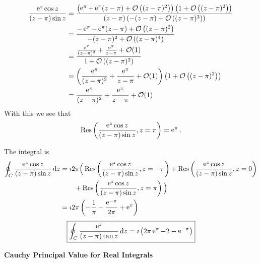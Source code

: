 {\begin{Solution}
\begin{enumerate}
    \begin{align*}
      \frac{\mathop{\mathrm{e}}\nolimits^z \cos z}{ (z - \pi) \sin z } 
      &= \frac{ \left( \mathop{\mathrm{e}}\nolimits^\pi + \mathop{\mathrm{e}}\nolimits^\pi (z - \pi) 
          + \mathcal{O}\left( (z - \pi)^2 \right) \right)
        \left( 1 + \mathcal{O}\left( (z - \pi)^2 \right) \right) }
      { (z - \pi) \left( - (z - \pi) 
          + \mathcal{O}\left( (z - \pi)^3 \right) \right) } \\
      &= \frac{ - \mathop{\mathrm{e}}\nolimits^\pi - \mathop{\mathrm{e}}\nolimits^\pi (z - \pi) 
        + \mathcal{O}\left( (z - \pi)^2 \right) }
      { - (z - \pi)^2 + \mathcal{O}\left( (z - \pi)^4 \right) } \\
      &= \frac{ \frac{ \mathop{\mathrm{e}}\nolimits^\pi }{ (z - \pi)^2 } 
        + \frac{ \mathop{\mathrm{e}}\nolimits^\pi }{ z - \pi } + \mathcal{O}( 1 ) }
      { 1 + \mathcal{O}\left( (z - \pi)^2 \right) } \\
      &= \left( \frac{ \mathop{\mathrm{e}}\nolimits^\pi }{ (z - \pi)^2 } 
        + \frac{ \mathop{\mathrm{e}}\nolimits^\pi }{ z - \pi } + \mathcal{O}( 1 ) \right)
      \left( 1 + \mathcal{O}\left( (z - \pi)^2 \right) \right) \\
      &= \frac{ \mathop{\mathrm{e}}\nolimits^\pi }{ (z - \pi)^2 } 
      + \frac{ \mathop{\mathrm{e}}\nolimits^\pi }{ z - \pi } + \mathcal{O}( 1 )
    \end{align*}
    With this we see that
    \[
    \mathop{\mathrm{Res}}\nolimits \left( \frac{\mathop{\mathrm{e}}\nolimits^z \cos z}{ (z - \pi) \sin z }, z = \pi \right)
    = \mathop{\mathrm{e}}\nolimits^\pi.
    \]

    The integral is
    \begin{align*}
      \oint_C \frac{\mathop{\mathrm{e}}\nolimits^z \cos z}{ (z - \pi) \sin z } \,\mathrm{d} z
      &= \imath 2 \pi \Big( \mathop{\mathrm{Res}}\nolimits \left( \frac{\mathop{\mathrm{e}}\nolimits^z \cos z}{ (z - \pi) \sin z }, 
        z = -\pi \right)
      + \mathop{\mathrm{Res}}\nolimits \left( \frac{\mathop{\mathrm{e}}\nolimits^z \cos z}{ (z - \pi) \sin z }, 
        z = 0 \right) \\
      &\qquad + \mathop{\mathrm{Res}}\nolimits \left( \frac{\mathop{\mathrm{e}}\nolimits^z \cos z}{ (z - \pi) \sin z }, 
        z = \pi \right) \Big) \\
      &= \imath 2 \pi \left( - \frac{1}{\pi} - \frac{ \mathop{\mathrm{e}}\nolimits^{-\pi} }{ 2 \pi } 
        + \mathop{\mathrm{e}}\nolimits^\pi \right) 
    \end{align*}
    \[
    \boxed{
      \oint_C \frac{\mathop{\mathrm{e}}\nolimits^z}{ (z - \pi) \tan z } \,\mathrm{d} z 
      = \imath \left( 2 \pi \mathop{\mathrm{e}}\nolimits^\pi - 2 - \mathop{\mathrm{e}}\nolimits^{-\pi} \right) 
      }
    \]
  \end{enumerate}
\end{Solution}




\begin{large}
  \noindent
  \textbf{Cauchy Principal Value for Real Integrals}
\end{large}






}
